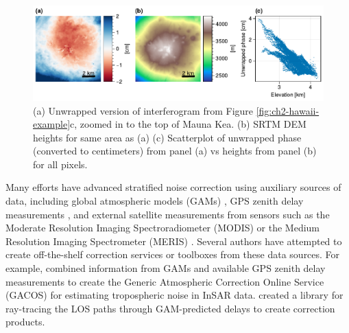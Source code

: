 \begin{figure}[!h]
	\centering
	\includegraphics[width=1.0\textwidth]{figures/chapter2-sar/hawaii-strat-zoom.pdf}
	\caption[Stratified tropospheric noise over Hawaii]{
		(a) Unwrapped version of interferogram from Figure \ref{fig:ch2-hawaii-example}c, zoomed in to the top of Mauna Kea.
		(b) SRTM DEM heights for same area as (a)
		(c) Scatterplot of unwrapped phase (converted to centimeters) from panel (a) vs heights from panel (b) for all pixels.
	}
	\label{fig:ch2-hawaii-strat}
\end{figure}


Many efforts have advanced stratified noise correction using auxiliary sources of data, including global atmospheric models (GAMs) \citep{Doin2009CorrectionsStratifiedTropospheric, Jolivet2011SystematicInsarTropospheric, Jolivet2014ImprovingInsarGeodesy, Cao2021AdvancedInsarTropospheric}, GPS zenith delay measurements \citep{Onn2006ModelingWaterVapor, Yu2017GenerationRealTime}, and external satellite measurements from sensors such as the Moderate Resolution Imaging Spectroradiometer (MODIS) \citep{Li2005InterferometricSyntheticAperture, Barnhart2013CharacterizingEstimatingNoise} or the Medium Resolution Imaging Spectrometer (MERIS)  \citep{Ding2008AtmosphericEffectsInsar}.
Several authors have attempted to create off-the-shelf correction services or toolboxes from these data sources. For example,	
\cite{Yu2018GenericAtmosphericCorrection} combined information from GAMs and available GPS zenith delay measurements to create the Generic Atmospheric Correction Online Service (GACOS) for estimating tropospheric noise in InSAR data. \cite{Maurer2021RaiderRaytracingAtmospheric} created a library for ray-tracing the LOS paths through GAM-predicted delays to create correction products.




